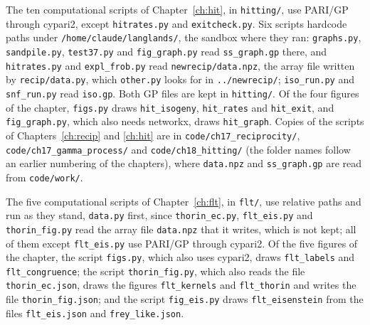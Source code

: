 The ten computational scripts of Chapter~\ref{ch:hit}, in \texttt{hitting/}, use PARI/GP through cypari2, except \texttt{hitrates.py} and \texttt{exitcheck.py}. Six scripts hardcode paths under \texttt{/home/claude/langlands/}, the sandbox where they ran: \texttt{graphs.py}, \texttt{sandpile.py}, \texttt{test37.py} and \texttt{fig\_graph.py} read \texttt{ss\_graph.gp} there, and \texttt{hitrates.py} and \texttt{expl\_frob.py} read \texttt{newrecip/data.npz}, the array file written by \texttt{recip/data.py}, which \texttt{other.py} looks for in \texttt{../newrecip/}; \texttt{iso\_run.py} and \texttt{snf\_run.py} read \texttt{iso.gp}. Both GP files are kept in \texttt{hitting/}. Of the four figures of the chapter, \texttt{figs.py} draws \texttt{hit\_isogeny}, \texttt{hit\_rates} and \texttt{hit\_exit}, and \texttt{fig\_graph.py}, which also needs networkx, draws \texttt{hit\_graph}. Copies of the scripts of Chapters~\ref{ch:recip} and \ref{ch:hit} are in \texttt{code/ch17\_reciprocity/}, \texttt{code/ch17\_gamma\_process/} and \texttt{code/ch18\_hitting/} (the folder names follow an earlier numbering of the chapters), where \texttt{data.npz} and \texttt{ss\_graph.gp} are read from \texttt{code/work/}.

The five computational scripts of Chapter~\ref{ch:flt}, in \texttt{flt/}, use relative paths and run as they stand, \texttt{data.py} first, since \texttt{thorin\_ec.py}, \texttt{flt\_eis.py} and \texttt{thorin\_fig.py} read the array file \texttt{data.npz} that it writes, which is not kept; all of them except \texttt{flt\_eis.py} use PARI/GP through cypari2. Of the five figures of the chapter, the script \texttt{figs.py}, which also uses cypari2, draws \texttt{flt\_labels} and \texttt{flt\_congruence}; the script \texttt{thorin\_fig.py}, which also reads the file \texttt{thorin\_ec.json}, draws the figures \texttt{flt\_kernels} and \texttt{flt\_thorin} and writes the file \texttt{thorin\_fig.json}; and the script \texttt{fig\_eis.py} draws \texttt{flt\_eisenstein} from the files \texttt{flt\_eis.json} and \texttt{frey\_like.json}.

